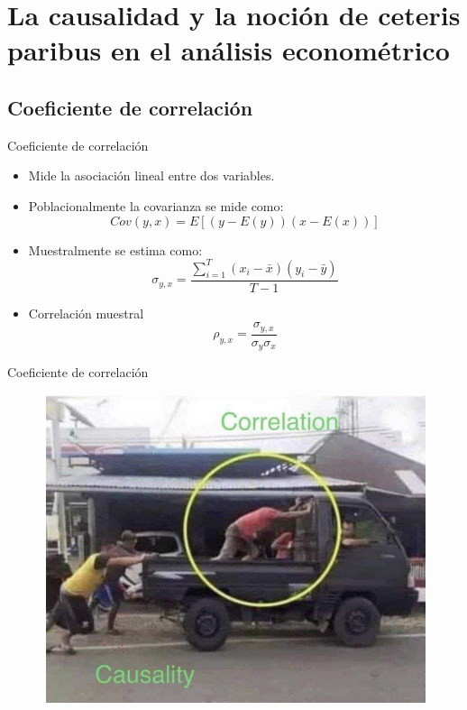 \section{La causalidad y la noción de ceteris paribus en el análisis econométrico}

\subsection{Coeficiente de correlación}
\begin{frame}{Coeficiente de correlación}
	\begin{itemize}
		\item Mide la asociación lineal entre dos variables.
		\item Poblacionalmente la covarianza se mide como:
		$$Cov(y,x)=E[(y-E(y))(x-E(x))]$$
		\item Muestralmente se estima como:
		$$\sigma_{y,x}=\frac{\sum_{i=1}^T(x_i-\bar{x})(y_i-\bar{y})}{T-1}$$
		\item Correlación muestral
		$$\rho_{y,x}=\frac{\sigma_{y,x}}{\sigma_{y}\sigma_{x}}$$
	\end{itemize}
\end{frame}
\begin{frame}{Coeficiente de correlación}
	\begin{figure}
		\centering
		\includegraphics[scale=.36]{figuras/cau_y_corr_1.png}
	\end{figure}
\end{frame}
